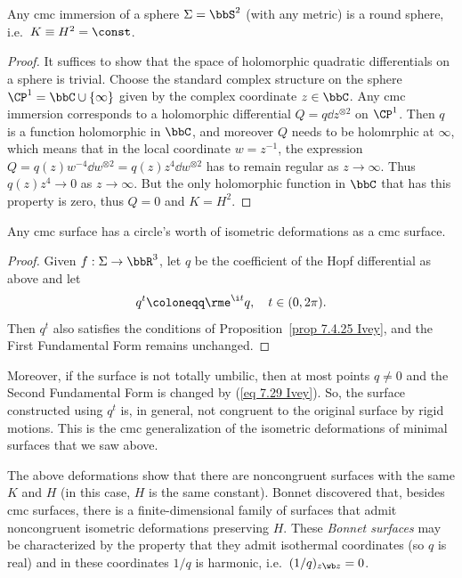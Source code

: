 \begin{cor}[Hopf]
    Any \gls{cmc} immersion of a sphere $\Sigma=\bbS^2$ (with any metric) is a round sphere, i.e.~$K\equiv H^2=\const$.
\end{cor}
\begin{proof}
    It suffices to show that the space of holomorphic quadratic differentials on a sphere is trivial.
    Choose the standard complex structure on the sphere $\CP^1=\bbC\cup \{\infty\}$ given by the complex coordinate $z\in\bbC$. Any \gls{cmc} immersion corresponds to a holomorphic differential $Q=q\dd z^{\otimes 2}$ on $\CP^1$. Then $q$ is a function holomorphic in $\bbC$, and moreover $Q$ needs to be holomrphic at $\infty$, which means that in the local coordinate $w=z^{-1}$, the expression $Q=q(z)w^{-4}\dd w^{\otimes 2}=q(z)z^{4}\dd w^{\otimes 2}$ has to remain regular as $z\to \infty$. Thus $q(z)z^4\to 0$ as $z\to\infty$. But the only holomorphic function in $\bbC$ that has this property is zero, thus $Q=0$ and $K=H^2$.
\end{proof}


\begin{cor}
    Any \gls{cmc} surface has a circle's worth of isometric deformations as a \gls{cmc} surface.
\end{cor}
\begin{proof}
    Given $f:\Sigma\to \bbR^3$, let $q$ be the coefficient of the Hopf differential as above and let 
    \[q^t\coloneqq \rme^{\i t}q,\quad t\in(0,2\pi).\label{eq 7.29 Ivey}\]
    Then $q^t$ also satisfies the conditions of Proposition~\ref{prop 7.4.25 Ivey}, and the First Fundamental Form remains unchanged.
\end{proof}

Moreover, if the surface is not totally umbilic, then at most points $q\neq 0$ and the Second Fundamental Form is changed by (\ref{eq 7.29 Ivey}). So, the surface constructed using $q^t$ is, in general, not congruent to the original surface by rigid motions. This is the \gls{cmc} generalization of the isometric deformations of minimal surfaces that we saw above.

\begin{rem}
    The above deformations show that there are noncongruent surfaces with the same $K$ and $H$ (in this case, $H$ is the same constant). Bonnet discovered that, besides \gls{cmc} surfaces, there is a finite-dimensional family of surfaces that admit noncongruent isometric deformations preserving $H$. These \emph{Bonnet surfaces} may be characterized by the property that they admit isothermal coordinates (so $q$ is real) and in these coordinates $1/q$ is harmonic, i.e.\ $(1/q)_{z\wb z}=0$.
\end{rem}










